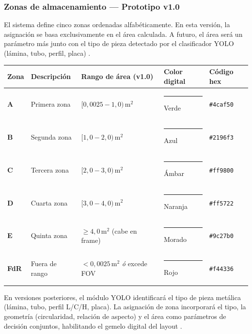 \documentclass[12pt, a4paper]{article}
\begin{document}
\subsubsection*{Zonas de almacenamiento --- Prototipo v1.0}

El sistema define cinco zonas ordenadas alfabéticamente. En esta versión, la
asignación se basa exclusivamente en el área calculada. A futuro, el área
será un parámetro más junto con el tipo de pieza detectado por el clasificador
YOLO (lámina, tubo, perfil, placa) \cite{li2020, tao2018}.

\vspace{0.3cm}
\begin{center}
\begin{tabular}{p{1.1cm} p{2.8cm} p{3.8cm} p{2.5cm} p{1.8cm}}
\toprule
\textbf{Zona} & \textbf{Descripción} & \textbf{Rango de área (v1.0)} & \textbf{Color digital} & \textbf{Código hex} \\
\midrule
\textbf{A} & Primera zona & $[0{,}0025 - 1{,}0)\,\text{m}^2$ &
  \textcolor{catA}{\rule{1.2cm}{0.25cm}} Verde & \texttt{\#4caf50} \\[3pt]
\textbf{B} & Segunda zona & $[1{,}0 - 2{,}0)\,\text{m}^2$ &
  \textcolor{catB}{\rule{1.2cm}{0.25cm}} Azul & \texttt{\#2196f3} \\[3pt]
\textbf{C} & Tercera zona & $[2{,}0 - 3{,}0)\,\text{m}^2$ &
  \textcolor{catC}{\rule{1.2cm}{0.25cm}} Ámbar & \texttt{\#ff9800} \\[3pt]
\textbf{D} & Cuarta zona & $[3{,}0 - 4{,}0)\,\text{m}^2$ &
  \textcolor{catD}{\rule{1.2cm}{0.25cm}} Naranja & \texttt{\#ff5722} \\[3pt]
\textbf{E} & Quinta zona & $\geq 4{,}0\,\text{m}^2$ (cabe en frame) &
  \textcolor{catE}{\rule{1.2cm}{0.25cm}} Morado & \texttt{\#9c27b0} \\
\midrule
\textbf{FdR} & Fuera de rango & $< 0{,}0025\,\text{m}^2$ \textit{ó} excede FOV &
  \textcolor{catOut}{\rule{1.2cm}{0.25cm}} Rojo & \texttt{\#f44336} \\
\bottomrule
\end{tabular}
\end{center}

\begin{notebox}[title={Evolución futura de la clasificación}]
En versiones posteriores, el módulo YOLO identificará el tipo de pieza metálica
(lámina, tubo, perfil L/C/H, placa). La asignación de zona incorporará el tipo,
la geometría (circularidad, relación de aspecto) y el área como parámetros de
decisión conjuntos, habilitando el gemelo digital del layout \cite{tao2018, jocher2023}.
\end{notebox}
\end{document}
